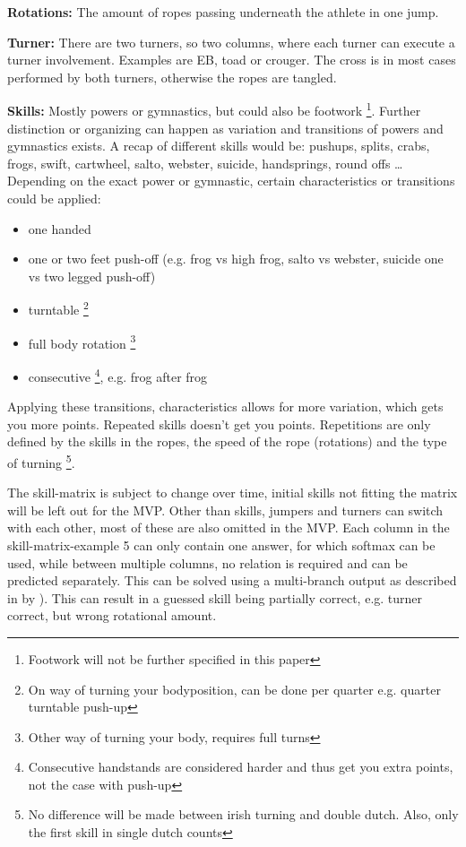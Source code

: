 \textbf{Rotations:} The amount of ropes passing underneath the athlete in one jump.

\textbf{Turner:} There are two turners, so two columns, where each turner can execute a turner involvement. Examples are EB, toad or crouger. The cross is in most cases performed by both turners, otherwise the ropes are tangled.

\textbf{Skills:} Mostly powers or gymnastics, but could also be footwork \footnote{Footwork will not be further specified in this paper}. Further distinction or organizing can happen as variation and transitions of powers and gymnastics exists. A recap of different skills would be: pushups, splits, crabs, frogs, swift, cartwheel, salto, webster, suicide, handsprings, round offs \dots %
Depending on the exact power or gymnastic, certain characteristics or transitions could be applied:

\begin{itemize}
    \item one handed
    \item one or two feet push-off (e.g. frog vs high frog, salto vs webster, suicide one vs two legged push-off)
    \item turntable \footnote{On way of turning your bodyposition, can be done per quarter e.g. quarter turntable push-up}
    \item full body rotation \footnote{Other way of turning your body, requires full turns}
    \item consecutive \footnote{Consecutive handstands are considered harder and thus get you extra points, not the case with push-up}, e.g. frog after frog
\end{itemize}

Applying these transitions, characteristics allows for more variation, which gets you more points. Repeated skills doesn't get you points. Repetitions are only defined by the skills in the ropes, the speed of the rope (rotations) and the type of turning \footnote{No difference will be made between irish turning and double dutch. Also, only the first skill in single dutch counts}.

\medskip

The skill-matrix is subject to change over time, initial skills not fitting the matrix will be left out for the MVP. Other than skills, jumpers and turners can switch with each other, most of these are also omitted in the MVP.
Each column in the skill-matrix-example 5 can only contain one answer, for which softmax can be used, while between multiple columns, no relation is required and can be predicted separately. This can be solved using a multi-branch output as described in by \autocite{Coulibaly_2022}). This can result in a guessed skill being partially correct, e.g. turner correct, but wrong rotational amount.

